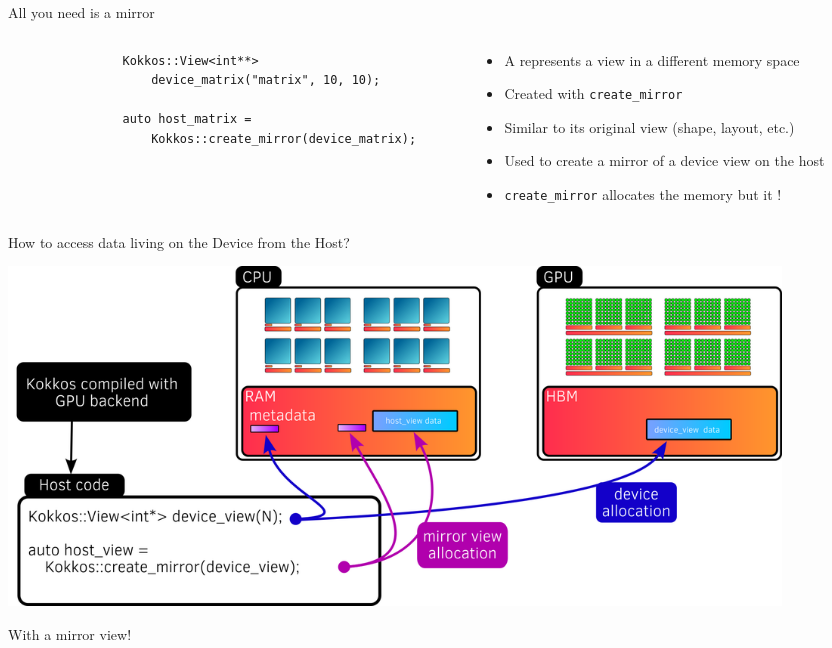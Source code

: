 \documentclass[
    aspectratio=169,
    handout,
]{beamer}
\begin{document}
\begin{frame}[fragile]{All you need is a mirror}
    \begin{columns}
        \begin{column}{0.6\linewidth}
            \begin{verbatim}
                Kokkos::View<int**>
                    device_matrix("matrix", 10, 10);

                auto host_matrix =
                    Kokkos::create_mirror(device_matrix);
            \end{verbatim}

        \end{column}
        \begin{column}{0.4\linewidth}
            \begin{itemize}
                \item A  represents a view in a different memory space
                \item Created with \texttt{create\_mirror}
                \item Similar to its original view (shape, layout, etc.)
                \item Used to create a mirror of a device view on the host
                \item \texttt{create\_mirror} allocates the memory but it !
            \end{itemize}
        \end{column}
    \end{columns}
\end{frame}


\begin{frame}{How to access data living on the Device from the Host?}
    \begin{center}
        \includegraphics[width=0.9\textwidth]{device_mirror_view.png}
    \end{center}

     With a mirror view!
\end{frame}
\end{document}
